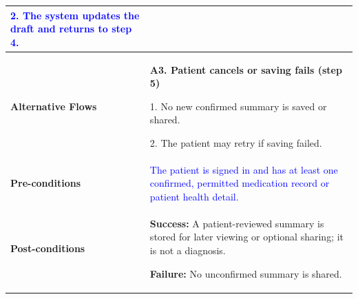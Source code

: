 \begin{longtable}{|p{}|p{}|}
\textcolor{blue}{2. The system updates the draft and returns to step 4.}
\\ \hline
\textbf{Alternative Flows} &
\textbf{A3. Patient cancels or saving fails (step 5)}\par
1. No new confirmed summary is saved or shared.\par
2. The patient may retry if saving failed.
\\ \hline
\textbf{Pre-conditions} &
\textcolor{blue}{The patient is signed in and has at least one confirmed, permitted medication record or patient health detail.}
\\ \hline
\textbf{Post-conditions} &
\textbf{Success:} A patient-reviewed summary is stored for later viewing or optional sharing; it is not a diagnosis.\par
\textbf{Failure:} No unconfirmed summary is shared.
\\ \hline
\end{longtable}
\clearpage

